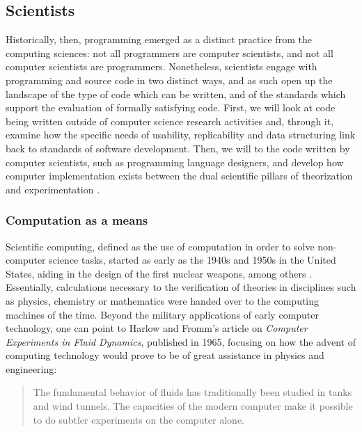 \vspace{2\baselineskip}

\subsection{Scientists}

Historically, then, programming emerged as a distinct practice from the computing sciences: not all programmers are computer scientists, and not all computer scientists are programmers. Nonetheless, scientists engage with programming and source code in two distinct ways, and as such open up the landscape of the type of code which can be written, and of the standards which support the evaluation of formally satisfying code. First, we will look at code being written outside of computer science research activities and, through it, examine how the specific needs of usability, replicability and data structuring link back to standards of software development. Then, we will to the code written by computer scientists, such as programming language designers, and develop how computer implementation exists between the dual scientific pillars of theorization and experimentation \citep{vardi_science_2010}.

\subsubsection{Computation as a means}

Scientific computing, defined as the use of computation in order to solve non-computer science tasks, started as early as the 1940s and 1950s in the United States, aiding in the design of the first nuclear weapons, among others \citep{oberkampf_verification_2010}. Essentially, calculations necessary to the verification of theories in disciplines such as physics, chemistry or mathematics were handed over to the computing machines of the time. Beyond the military applications of early computer technology, one can point to Harlow and Fromm's article on \emph{Computer Experiments in Fluid Dynamics}, published in 1965, focusing on how the advent of computing technology would prove to be of great assistance in physics and engineering:

\begin{quote}
  The fundamental behavior of fluids has traditionally been studied in tanks and wind tunnels. The capacities of the modern computer make it possible to do subtler experiments on the computer alone. \citep{harlow_computer_1965}
\end{quote}

